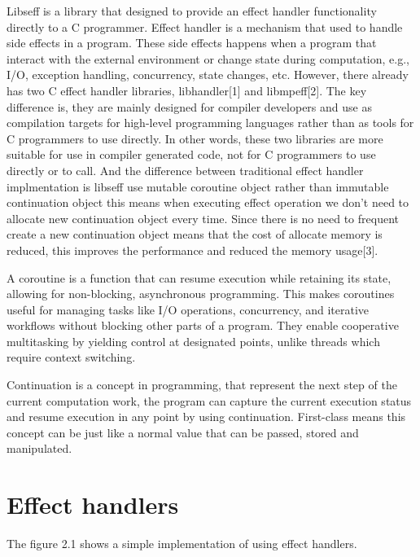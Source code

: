 \documentclass[logo,bsc,singlespacing,parskip]{infthesis}
\begin{document}
Libseff is a library that designed to provide an effect handler functionality directly to a C programmer. Effect handler is a mechanism that used to handle side effects in a program. These side effects happens when a program that interact with the external environment or change state during computation, e.g., I/O, exception handling, concurrency, state changes, etc. However, there already has two C effect handler libraries, libhandler[1] and libmpeff[2]. The key difference is, they are mainly designed for compiler developers and use as compilation targets for high-level programming languages rather than as tools for C programmers to use directly. In other words, these two libraries are more suitable for use in compiler generated code, not for C programmers to use directly or to call. And the difference between traditional effect handler implmentation is libseff use mutable coroutine object rather than immutable continuation object this means when executing effect operation we don't need to allocate new continuation object every time. Since there is no need to frequent create a new continuation object means that the cost of allocate memory is reduced, this improves the performance and reduced the memory usage[3].

A coroutine is a function that can resume execution while retaining its state, allowing for non-blocking, asynchronous programming. This makes coroutines useful for managing tasks like I/O operations, concurrency, and iterative workflows without blocking other parts of a program. They enable cooperative multitasking by yielding control at designated points, unlike threads which require context switching.

Continuation is a concept in programming, that represent the next step of the current computation work, the program can capture the current execution status and resume execution in any point by using continuation. First-class means this concept can be just like a normal value that can be passed, stored and manipulated. 
\medskip

\section{Effect handlers}

The figure 2.1 shows a simple implementation of using effect handlers.
\end{document}
